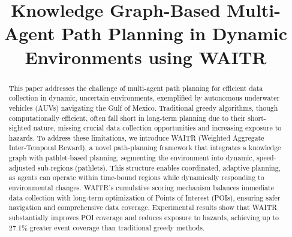 \documentclass[conference]{IEEEtran}
\begin{document}
\title{Knowledge Graph-Based Multi-Agent Path Planning in Dynamic Environments using WAITR}

\author{
\and
{}

\and
{}
}


\maketitle

\begin{abstract}
This paper addresses the challenge of multi-agent path planning for efficient data collection in dynamic, uncertain environments, exemplified by autonomous underwater vehicles (AUVs) navigating the Gulf of Mexico. Traditional greedy algorithms, though computationally efficient, often fall short in long-term planning due to their short-sighted nature, missing crucial data collection opportunities and increasing exposure to hazards. To address these limitations, we introduce WAITR (Weighted Aggregate Inter-Temporal Reward), a novel path-planning framework that integrates a knowledge graph with pathlet-based planning, segmenting the environment into dynamic, speed-adjusted sub-regions (pathlets). This structure enables coordinated, adaptive planning, as agents can operate within time-bound regions while dynamically responding to environmental changes. WAITR's cumulative scoring mechanism balances immediate data collection with long-term optimization of Points of Interest (POIs), ensuring safer navigation and comprehensive data coverage. Experimental results show that WAITR substantially improves POI coverage and reduces exposure to hazards, achieving up to 27.1\% greater event coverage than traditional greedy methods.
\end{abstract}
\end{document}
